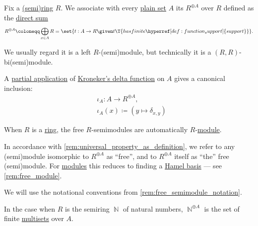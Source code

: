 \begin{definition}\label{def:free_semimodule}\mimprovised
  Fix a \hyperref[def:semiring]{(semi)ring} \( R \). We associate with every \hyperref[def:set]{plain set} \( A \) its  \( R^{\oplus A} \) over \( R \) defined as the \hyperref[def:external_semimodule_direct_sum]{direct sum}
  \begin{equation*}
    R^{\oplus A} \coloneqq \bigoplus_{x \in A} R = \set{ t: A \to R \given t \T{has finite \hyperref[def:function_support]{support}} }.
  \end{equation*}

  We usually regard it is a left \( R \)-(semi)module, but technically it is a \( (R, R) \)-bi(semi)module.

  \begin{thmenum}
     A \hyperref[alg:untyped_lambda_term_to_function]{partial application} of \hyperref[def:kronecker_delta]{Kroneker's delta function} on \( A \) gives a canonical inclusion:
    \begin{equation*}
      \begin{aligned}
        &\iota_A: A \to R^{\oplus A}, \\
        &\iota_A(x) \coloneqq (y \mapsto \delta_{x, y})
      \end{aligned}
    \end{equation*}
  \end{thmenum}
\end{definition}
\begin{comments}
  \item When \( R \) is a \hyperref[def:ring]{ring}, the free \( R \)-semimodules are automatically \( R \)-\hyperref[def:module]{module}.

  \item In accordance with \cref{rem:universal_property_as_definition}, we refer to any (semi)module isomorphic to \( R^{\oplus A} \) as \enquote{free}, and to \( R^{\oplus A} \) itself as \enquote{the} free (semi)module. For \hyperref[def:module]{modules} this reduces to finding a \hyperref[def:hamel_basis]{Hamel basis} --- see \cref{rem:free_module}.

  \item We will use the notational conventions from \cref{rem:free_semimodule_notation}.

  \item In the case when \( R \) is the semiring \( \BbbN \) of natural numbers, \( \BbbN^{\oplus A} \) is the set of finite \hyperref[def:multiset]{multisets} over \( A \).
\end{comments}

